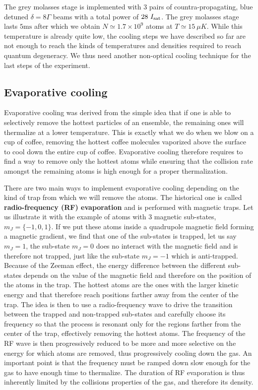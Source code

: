 The grey molasses stage is implemented with 3 pairs of countra-propagating, blue detuned $\delta =8 \Gamma$ beams with a total power of $28 \ \Isat$. The grey molasses stage lasts $5 \mathrm{ms}$ after which we obtain $N \simeq 1.7 \times 10^9$ atoms at $T \simeq 15 \ \mu K$. While this temperature is already quite low, the cooling steps we have described so far are not enough to reach the kinds of temperatures and densities required to reach quantum degeneracy. We thus need another non-optical cooling technique for the last steps of the experiment.

\subsection{Evaporative cooling}

Evaporative cooling was derived from the simple idea that if one is able to selectively remove the hottest particles of an ensemble, the remaining ones will thermalize at a lower temperature. This is exactly what we do when we blow on a cup of coffee, removing the hottest coffee molecules vaporized above the surface to cool down the entire cup of coffee. Evaporative cooling therefore requires to find a way to remove only the hottest atoms while ensuring that the collision rate amongst the remaining atoms is high enough for a proper thermalization. 

There are two main ways to implement evaporative cooling depending on the kind of trap from which we will remove the atoms. The historical one is called \textbf{radio-frequency (RF) evaporation} and is performed with magnetic traps. Let us illustrate it with the example of atoms with 3 magnetic sub-states, $m_J=\{-1,0,1\}$. If we put these atoms inside a quadrupole magnetic field forming a magnetic gradient, we find that one of the sub-states is trapped, let us say $m_J=1$, the sub-state $m_J=0$ does no interact with the magnetic field and is therefore not trapped, just like the sub-state $m_J=-1$ which is anti-trapped. Because of the Zeeman effect, the energy difference between the different sub-states depends on the value of the magnetic field and therefore on the position of the atoms in the trap. The hottest atoms are the ones with the larger kinetic energy and that therefore reach positions farther away from the center of the trap. The idea is then to use a radio-frequency wave to drive the transition between the trapped and non-trapped sub-states and carefully choose its frequency so that the process is resonant only for the regions farther from the center of the trap, effectively removing the hottest atoms. The frequency of the RF wave is then progressively reduced to be more and more selective on the energy for which atoms are removed, thus progressively cooling down the gas. An important point is that the frequency must be ramped down slow enough for the gas to have enough time to thermalize. The duration of RF evaporation is thus inherently limited by the collisions properties of the gas, and therefore its density.

